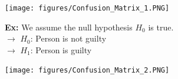 \documentclass[letterpaper, 10.5pt,landscape]{article}
\makeatletter
\renewcommand{\section}{\@startsection{section}{1}{0mm}%
                                {-1ex plus -.5ex minus -.2ex}%
                                {0.1ex plus .2ex}%
                                {\normalfont\small}}
\makeatother
\begin{document}
\begin{multicols*}{3}
\begin{center}
    \begin{minipage}{0.70\linewidth}
        \texttt{[image: figures/Confusion\_Matrix\_1.PNG]}
    \end{minipage}
\end{center}

\vspace{3pt}
\textbf{Ex:} We assume the null hypothesis $H_{0}$  is true. \\
$\rightarrow$ $H_{0}$: Person is not guilty  \\
$\rightarrow$ $H_{1}$: Person is guilty  \\


\begin{center}
    \begin{minipage}{\linewidth}
        \texttt{[image: figures/Confusion\_Matrix\_2.PNG]}
    \end{minipage}
\end{center}




















































\end{multicols*}
\end{document}
